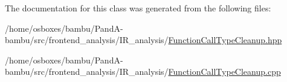 The documentation for this class was generated from the following files\+:\begin{DoxyCompactItemize}
\item 
/home/osboxes/bambu/\+Pand\+A-\/bambu/src/frontend\+\_\+analysis/\+I\+R\+\_\+analysis/\hyperlink{FunctionCallTypeCleanup_8hpp}{Function\+Call\+Type\+Cleanup.\+hpp}\item 
/home/osboxes/bambu/\+Pand\+A-\/bambu/src/frontend\+\_\+analysis/\+I\+R\+\_\+analysis/\hyperlink{FunctionCallTypeCleanup_8cpp}{Function\+Call\+Type\+Cleanup.\+cpp}\end{DoxyCompactItemize}
